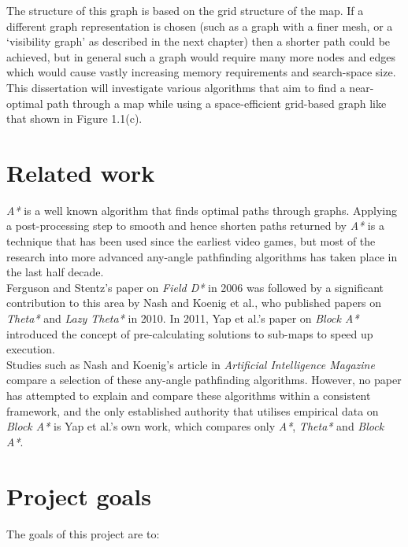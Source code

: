 \documentclass[12pt,notitlepage]{report}
\begin{document}
\noindent
The structure of this graph is based on the grid structure of the map. If a different graph representation is chosen (such as a graph with a finer mesh, or a `visibility graph' as described in the next chapter) then a shorter path could be achieved, but in general such a graph would require many more nodes and edges which would cause vastly increasing memory requirements and search-space size. This dissertation will investigate various algorithms that aim to find a near-optimal path through a map while using a space-efficient grid-based graph like that shown in Figure 1.1(c).\\

\section{Related work}

{\em A*} is a well known algorithm that finds optimal paths through graphs. Applying a post-processing step to smooth and hence shorten paths returned by {\em A*} is a technique that has been used since the earliest video games\cite{Thorpe84}, but most of the research into more advanced any-angle pathfinding algorithms has taken place in the last half decade. \\

\noindent
Ferguson and Stentz's paper on {\em Field D*}\cite{FergusonStentz06} in 2006 was followed by a significant contribution to this  area by Nash and Koenig et al., who published papers on {\em Theta*}\cite{Daniel10} and {\em Lazy Theta*}\cite{Nash10} in 2010. In 2011, Yap et al.'s paper on {\em Block A*}\cite{Yap11} introduced the concept of pre-calculating solutions to sub-maps to speed up execution.\\

\noindent
Studies such as Nash and Koenig's article in {\em Artificial Intelligence Magazine}\cite{Nash13} compare a selection of these any-angle pathfinding algorithms. However, no paper has attempted to explain and compare these algorithms within a consistent framework, and the only established authority that utilises empirical data on {\em Block A*} is Yap et al.'s own work\cite{Yap11,Yap11_2}, which compares only {\em A*}, {\em Theta*} and {\em Block A*}.

\section {Project goals}

\noindent
The goals of this project are to:
\end{document}
